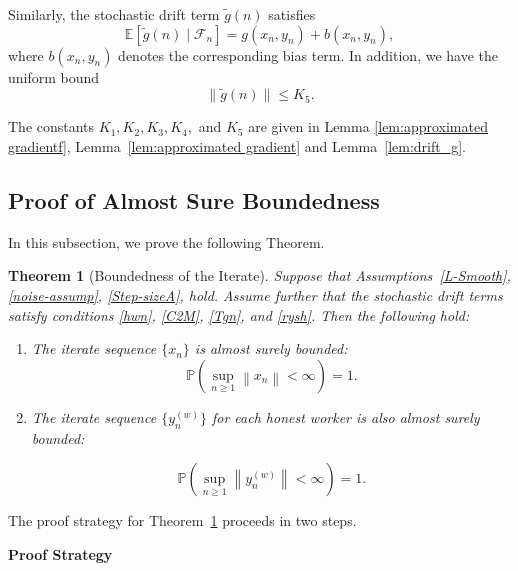 \documentclass{article}
\newtheorem{theorem}{Theorem}[section]
\newcommand{\norm}[1]{\left\lVert #1 \right\rVert}
\begin{document}
Similarly, the stochastic drift term $\widetilde g(n)$ satisfies
\begin{equation}
\mathbb{E}\!\left[
\widetilde g(n)
\mid
\mathcal{F}_n
\right]
=
g(x_n,y_n)
+
b(x_n,y_n),
\label{Tgn}
\end{equation}
where $b(x_n,y_n)$ denotes the corresponding bias term. In addition, we have the uniform bound
\begin{equation}
\|\widetilde g(n)\|
\le
K_5 .
\label{rysh}
\end{equation}

The constants $K_1,K_2,K_3,K_4,$ and $K_5$ are given in Lemma \ref{lem:approximated gradientf}, 
Lemma~\ref{lem:approximated gradient} and
Lemma~\ref{lem:drift_g}.


\subsection{Proof of Almost Sure Boundedness}
In this subsection, we prove the following Theorem. 
\begin{theorem}[Boundedness of the Iterate] Suppose that Assumptions~\ref{L-Smooth}, \ref{noise-assump}, \ref{Step-sizeA}, hold. Assume further that the stochastic drift terms
satisfy conditions \eqref{hwn}, \eqref{C2M}, \eqref{Tgn}, and
\eqref{rysh}. 
 Then  the following hold:
    \begin{enumerate}
      \item The iterate sequence $\{x_n \}$   is almost surely bounded:
\begin{equation*}
            \mathbb{P}(\sup\limits_{n \geq 1} \norm{x_n} < \infty) = 1. 
        \end{equation*}
 \item The iterate sequence $\{y_n^{(w)} \}$  for each honest worker is also almost surely bounded:

        \begin{equation*}
            \mathbb{P}(\sup\limits_{n \geq 1} \norm{y_n^{(w)}} < \infty) = 1. 
        \end{equation*}
    \end{enumerate}
    \label{thm:almst boundeness}
\end{theorem}
The proof strategy for Theorem~\ref{thm:almst boundeness} proceeds in two steps.

\textbf{Proof Strategy}
\end{document}
